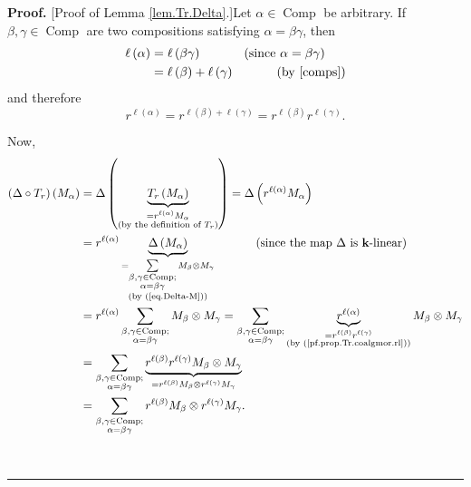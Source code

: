\documentclass[numbers=enddot,12pt,final,onecolumn,notitlepage]{scrartcl}%
\theoremstyle{definition}
\newenvironment{proof}[1][Proof]{\noindent\textbf{#1.} }{\ \rule{0.5em}{0.5em}}
\let\sumnonlimits\sum
\renewcommand{\sum}{\sumnonlimits\limits}
\newenvironment{verlong}{}{}
\begin{document}
\begin{verlong}


\begin{proof}
[Proof of Lemma \ref{lem.Tr.Delta}.]Let $\alpha\in\operatorname*{Comp}$ be
arbitrary. If $\beta,\gamma\in\operatorname*{Comp}$ are two compositions
satisfying $\alpha=\beta\gamma$, then%
\begin{align*}
\ell\left(  \alpha\right)   &  =\ell\left(  \beta\gamma\right)
\ \ \ \ \ \ \ \ \ \ \left(  \text{since }\alpha=\beta\gamma\right) \\
&  =\ell\left(  \beta\right)  +\ell\left(  \gamma\right)
\ \ \ \ \ \ \ \ \ \ \left(  \text{by \cite[Proposition 5.2 \textbf{(a)}%
]{comps}}\right)
\end{align*}
and therefore%
\begin{equation}
r^{\ell\left(  \alpha\right)  }=r^{\ell\left(  \beta\right)  +\ell\left(
\gamma\right)  }=r^{\ell\left(  \beta\right)  }r^{\ell\left(  \gamma\right)
}. \label{pf.prop.Tr.coalgmor.rl}%
\end{equation}


Now,
\begin{align}
\left(  \Delta\circ T_{r}\right)  \left(  M_{\alpha}\right)   &
=\Delta\left(  \underbrace{T_{r}\left(  M_{\alpha}\right)  }%
_{\substack{=r^{\ell\left(  \alpha\right)  }M_{\alpha}\\\text{(by the
definition of }T_{r}\text{)}}}\right)  =\Delta\left(  r^{\ell\left(
\alpha\right)  }M_{\alpha}\right) \nonumber\\
&  =r^{\ell\left(  \alpha\right)  }\underbrace{\Delta\left(  M_{\alpha
}\right)  }_{\substack{=\sum_{\substack{\beta,\gamma\in\operatorname*{Comp}%
;\\\alpha=\beta\gamma}}M_{\beta}\otimes M_{\gamma}\\\text{(by
(\ref{eq.Delta-M}))}}}\ \ \ \ \ \ \ \ \ \ \left(  \text{since the map }%
\Delta\text{ is }\mathbf{k}\text{-linear}\right) \nonumber\\
&  =r^{\ell\left(  \alpha\right)  }\sum_{\substack{\beta,\gamma\in
\operatorname*{Comp};\\\alpha=\beta\gamma}}M_{\beta}\otimes M_{\gamma}%
=\sum_{\substack{\beta,\gamma\in\operatorname*{Comp};\\\alpha=\beta\gamma
}}\underbrace{r^{\ell\left(  \alpha\right)  }}_{\substack{=r^{\ell\left(
\beta\right)  }r^{\ell\left(  \gamma\right)  }\\\text{(by
(\ref{pf.prop.Tr.coalgmor.rl}))}}}M_{\beta}\otimes M_{\gamma}\nonumber\\
&  =\sum_{\substack{\beta,\gamma\in\operatorname*{Comp};\\\alpha=\beta\gamma
}}\underbrace{r^{\ell\left(  \beta\right)  }r^{\ell\left(  \gamma\right)
}M_{\beta}\otimes M_{\gamma}}_{=r^{\ell\left(  \beta\right)  }M_{\beta}\otimes
r^{\ell\left(  \gamma\right)  }M_{\gamma}}\nonumber\\
&  =\sum_{\substack{\beta,\gamma\in\operatorname*{Comp};\\\alpha=\beta\gamma
}}r^{\ell\left(  \beta\right)  }M_{\beta}\otimes r^{\ell\left(  \gamma\right)
}M_{\gamma}. \label{pf.lem.Tr.Delta.1}%
\end{align}



\end{proof}
\end{verlong}
\end{document}
